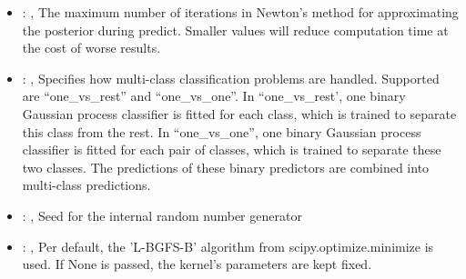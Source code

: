 \begin{itemize}
    \item {}: , 
      The maximum number of iterations in Newton’s method for approximating the posterior during
      predict. Smaller values will reduce computation time at
      the cost of worse results.

    \item {}: , 
      Specifies how multi-class classification problems are handled. Supported are ``one\_vs\_rest''
      and ``one\_vs\_one''.                                                         In
      ``one\_vs\_rest', one binary Gaussian process classifier is fitted for each class, which is
      trained to separate this class                                                         from
      the rest. In ``one\_vs\_one'', one binary Gaussian process classifier is fitted for each pair
      of classes, which is trained to
      separate these two classes. The predictions of these binary predictors are combined into
      multi-class predictions.

    \item {}: , 
      Seed for the internal random number generator

    \item {}: , 
      Per default, the 'L-BGFS-B' algorithm from
      scipy.optimize.minimize is used. If None is passed, the kernel’s
      parameters are kept fixed.
  \end{itemize}


